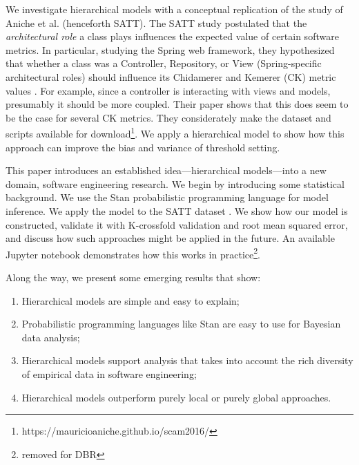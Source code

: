 \documentclass[sigconf,natbib=false]{acmart}
\begin{document}
We investigate hierarchical models with a conceptual replication of the study of Aniche et al. \cite{Aniche2016} (henceforth SATT). The SATT study postulated that the \emph{architectural role} a class plays influences the expected value of certain software metrics. In particular, studying the Spring web framework, they hypothesized that whether a class was a Controller, Repository, or View (Spring-specific architectural roles) should influence its Chidamerer and Kemerer (CK) metric values \cite{Chidamber_1991}. For example, since a controller is interacting with views and models, presumably it should be more coupled. Their paper shows that this does seem to be the case for several CK metrics. They considerately make the dataset and scripts available for download\footnote{https://mauricioaniche.github.io/scam2016/}. We apply a hierarchical model to show how this approach can improve the bias and variance of threshold setting.

This paper introduces an established idea---hierarchical models---into a new domain, software engineering research. We begin by introducing some statistical background. We use the Stan probabilistic programming language \cite{Carpenter2017} for model inference. We apply the model to the SATT dataset  \cite{Aniche2016}. We show how our model is constructed, validate it with K-crossfold validation and root mean squared error, and discuss how such approaches might be applied in the future. An available Jupyter notebook demonstrates how this works in practice\footnote{removed for DBR}.

Along the way, we present some emerging results that show:
\begin{enumerate}
	\item Hierarchical models are simple and easy to explain;
	\item Probabilistic programming languages like Stan are easy to use  for  Bayesian data analysis;
	\item Hierarchical models support analysis that takes into account the rich diversity of empirical data in software engineering;
	\item Hierarchical models outperform purely local or purely global approaches.
\end{enumerate}

\end{document}
